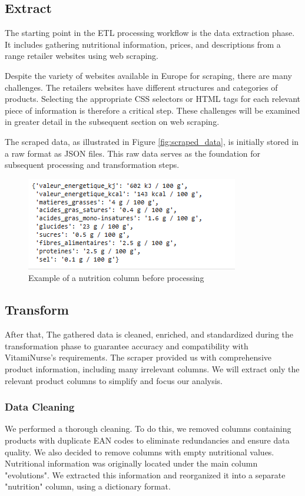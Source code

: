 \subsection{Extract}

\par The starting point in the ETL processing workflow is the data extraction phase. It includes gathering nutritional information, prices, and
descriptions from a range retailer websites using web scraping.
\par Despite the variety of websites available in Europe for scraping, there
are many challenges. The retailers websites have different structures and
categories of products. Selecting the appropriate CSS selectors or HTML
tags for each relevant piece of information is therefore a critical step.
These challenges will be examined in greater detail in the subsequent
section on web scraping.
\par The scraped data, as illustrated in Figure \ref{fig:scraped_data}, is initially stored in a raw format as JSON files. This raw data serves as the foundation for subsequent processing and transformation steps.
\begin{center}
\begin{figure}[H]
\centering
\includegraphics[scale=0.66]{images/nutrition.png}
\caption{Example of a nutrition column before processing} 
\label{fig:Nutrition_column}
\end{figure}
\end{center}

\subsection{Transform}
After that, The gathered data is cleaned, enriched, and standardized
during the transformation phase to guarantee accuracy and compatibility with VitamiNurse’s requirements.
The scraper provided us with comprehensive product information, including many irrelevant columns. We will extract only the relevant product columns to simplify and focus our
analysis.

\subsubsection{Data Cleaning}
We performed a thorough cleaning. To do this, we removed columns
containing products with duplicate EAN codes to eliminate redundancies
and ensure data quality. We also decided to remove columns with
empty nutritional values. Nutritional information was originally located
under the main column "evolutions". We extracted this information and
reorganized it into a separate "nutrition" column, using a dictionary
format.


